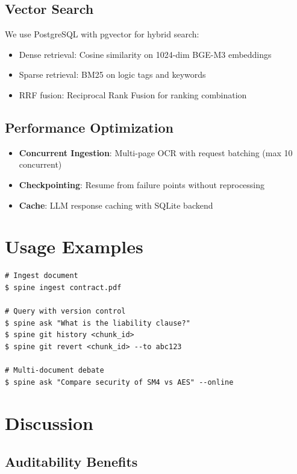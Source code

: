 \documentclass[11pt]{article}
\begin{document}
\subsection{Vector Search}

We use PostgreSQL with pgvector for hybrid search:
\begin{itemize}
    \item Dense retrieval: Cosine similarity on 1024-dim BGE-M3 embeddings
    \item Sparse retrieval: BM25 on logic tags and keywords
    \item RRF fusion: Reciprocal Rank Fusion for ranking combination
\end{itemize}

\subsection{Performance Optimization}

\begin{itemize}
    \item \textbf{Concurrent Ingestion}: Multi-page OCR with request batching (max 10 concurrent)
    \item \textbf{Checkpointing}: Resume from failure points without reprocessing
    \item \textbf{Cache}: LLM response caching with SQLite backend
\end{itemize}

\section{Usage Examples}

\begin{verbatim}
# Ingest document
$ spine ingest contract.pdf

# Query with version control
$ spine ask "What is the liability clause?"
$ spine git history <chunk_id>
$ spine git revert <chunk_id> --to abc123

# Multi-document debate
$ spine ask "Compare security of SM4 vs AES" --online
\end{verbatim}

\section{Discussion}

\subsection{Auditability Benefits}
\end{document}
